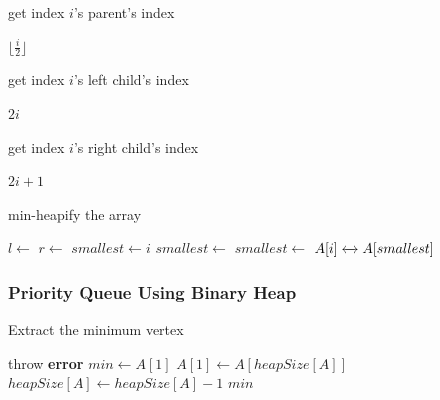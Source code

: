 \documentclass{beamer}
\begin{document}
\begin{frame}
	\begin{algorithm}[H]
		\caption{get index \( i \)'s parent's index}
		\begin{algorithmic}[1]
			\State \Return \( \lfloor \frac{ i }{ 2 }  \rfloor \) 
			\EndFunction
		\end{algorithmic}
	\end{algorithm}	

	\begin{algorithm}[H]
		\caption{get index \( i \)'s left child's index}
		\begin{algorithmic}[1]
			\State \Return \( 2i \)  
			\EndFunction
		\end{algorithmic}
	\end{algorithm}	

	\begin{algorithm}[H]
		\caption{get index \( i \)'s right child's index}
		\begin{algorithmic}[1]
			\State \Return \( 2i+1 \)  
			\EndFunction
		\end{algorithmic}
	\end{algorithm}	
\end{frame}

\begin{frame}
	\begin{algorithm}[H]
		\caption{min-heapify the array}
		\begin{algorithmic}[1]
			\State \(l \gets \) 
			\State \( r \gets \) 
			\State \( smallest \gets i \) 
			\State \( smallest \gets \) 
			\EndIf
			\State \( smallest \gets \) 
			\EndIf
			\State \( A[i] \xleftrightarrow{} A[smallest] \)
			\State {}
			\EndIf
			\EndFunction
		\end{algorithmic}
	\end{algorithm}	
\end{frame}

\begin{frame}
	\frametitle{Priority Queue Using Binary Heap}
	\begin{algorithm}[H]
		\caption{Extract the minimum vertex}
		\begin{algorithmic}[1]
			\State throw \textbf{error}  
			\EndIf
			\State \( min \gets A[1] \) 
			\State \( A[1] \gets A[heapSize[A]]\) 
			\State \( heapSize[A] \gets heapSize[A]-1\) 
			\State {} 
			\State \Return \( min \) 
			\EndFunction
		\end{algorithmic}
	\end{algorithm}
\end{frame}
\end{document}
